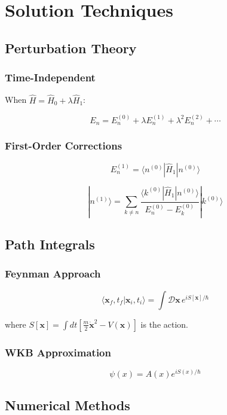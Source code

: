 \documentclass[12pt]{book}
\begin{document}
\part{Solution Techniques}

\chapter{Perturbation Theory}

\section{Time-Independent}

When $\hat{H} = \hat{H}_0 + \lambda\hat{H}_1$:

$$E_n = E_n^{(0)} + \lambda E_n^{(1)} + \lambda^2 E_n^{(2)} + \cdots$$

\section{First-Order Corrections}

$$E_n^{(1)} = \langle n^{(0)}|\hat{H}_1|n^{(0)}\rangle$$

$$|n^{(1)}\rangle = \sum_{k \ne n} \frac{\langle k^{(0)}|\hat{H}_1|n^{(0)}\rangle}{E_n^{(0)} - E_k^{(0)}}|k^{(0)}\rangle$$

\chapter{Path Integrals}

\section{Feynman Approach}

$$\langle\mathbf{x}_f, t_f | \mathbf{x}_i, t_i\rangle = \int \mathcal{D}\mathbf{x} \, e^{iS[\mathbf{x}]/\hbar}$$

where $S[\mathbf{x}] = \int dt \left[\frac{m}{2}\dot{\mathbf{x}}^2 - V(\mathbf{x})\right]$ is the action.

\section{WKB Approximation}

$$\psi(x) = A(x)e^{iS(x)/\hbar}$$

\chapter{Numerical Methods}
\end{document}
